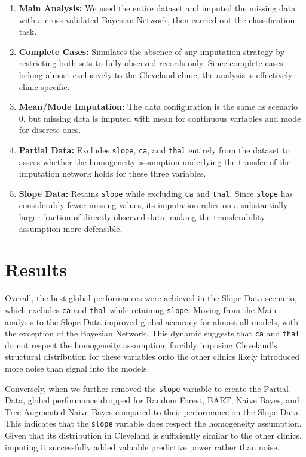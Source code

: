 \documentclass[11pt, a4paper]{article}
\begin{document}
	\begin{enumerate}
		\item[\textbf{0.}] \textbf{Main Analysis:} We used the entire dataset and imputed the missing data with a cross-validated Bayesian Network, then carried out the classification task.
		\item[\textbf{1.}] \textbf{Complete Cases:} Simulates the absence of any imputation strategy by restricting both sets to fully observed records only. Since complete cases belong almost exclusively to the Cleveland clinic, the analysis is effectively clinic-specific.
		\item[\textbf{2.}] \textbf{Mean/Mode Imputation:} The data configuration is the same as scenario 0, but missing data is imputed with mean for continuous variables and mode for discrete ones.
		\item[\textbf{3.}] \textbf{Partial Data:} Excludes \texttt{slope}, \texttt{ca}, and \texttt{thal} entirely from the dataset to assess whether the homogeneity assumption underlying the transfer of the imputation network holds for these three variables.
		\item[\textbf{4.}] \textbf{Slope Data:} Retains \texttt{slope} while excluding \texttt{ca} and \texttt{thal}. Since \texttt{slope} has considerably fewer missing values, its imputation relies on a substantially larger fraction of directly observed data, making the transferability assumption more defensible.
	\end{enumerate}
	
	\section{Results}
	Overall, the best global performances were achieved in the Slope Data scenario, which excludes \texttt{ca} and \texttt{thal} while retaining \texttt{slope}. Moving from the Main analysis to the Slope Data improved global accuracy for almost all models, with the exception of the Bayesian Network. This dynamic suggests that \texttt{ca} and \texttt{thal} do not respect the homogeneity assumption; forcibly imposing Cleveland's structural distribution for these variables onto the other clinics likely introduced more noise than signal into the models.
	
	Conversely, when we further removed the \texttt{slope} variable to create the Partial Data, global performance dropped for Random Forest, BART, Naive Bayes, and Tree-Augmented Naive Bayes compared to their performance on the Slope Data. This indicates that the \texttt{slope} variable does respect the homogeneity assumption. Given that its distribution in Cleveland is sufficiently similar to the other clinics, imputing it successfully added valuable predictive power rather than noise.
	
\end{document}
